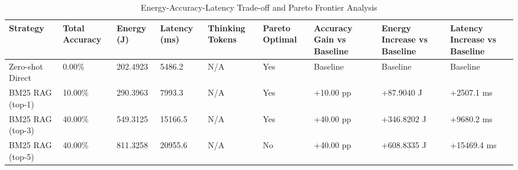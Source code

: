 \begin{table}
\caption{Energy-Accuracy-Latency Trade-off and Pareto Frontier Analysis}
\label{tab:tradeoff_comparison}
\begin{tabular}{lllllllll}
\toprule
Strategy & Total Accuracy & Energy (J) & Latency (ms) & Thinking Tokens & Pareto Optimal & Accuracy Gain vs Baseline & Energy Increase vs Baseline & Latency Increase vs Baseline \\
\midrule
Zero-shot Direct & 0.00\% & 202.4923 & 5486.2 & N/A & Yes & Baseline & Baseline & Baseline \\
BM25 RAG (top-1) & 10.00\% & 290.3963 & 7993.3 & N/A & Yes & +10.00 pp & +87.9040 J & +2507.1 ms \\
BM25 RAG (top-3) & 40.00\% & 549.3125 & 15166.5 & N/A & Yes & +40.00 pp & +346.8202 J & +9680.2 ms \\
BM25 RAG (top-5) & 40.00\% & 811.3258 & 20955.6 & N/A & No & +40.00 pp & +608.8335 J & +15469.4 ms \\
\bottomrule
\end{tabular}
\end{table}
